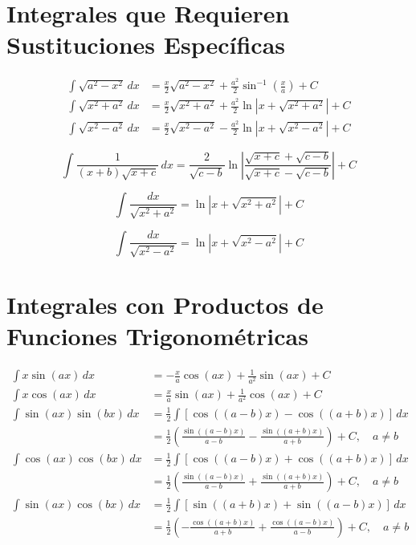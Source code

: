 \documentclass[11pt]{article}
\begin{document}
\section*{Integrales que Requieren Sustituciones Específicas}

\begin{align}
    \int \sqrt{a^2 - x^2} \, dx &= \frac{x}{2} \sqrt{a^2 - x^2} + \frac{a^2}{2} \sin^{-1}\left(\frac{x}{a}\right) + C \\[10pt]
    \int \sqrt{x^2 + a^2} \, dx &= \frac{x}{2} \sqrt{x^2 + a^2} + \frac{a^2}{2} \ln\left| x + \sqrt{x^2 + a^2} \right| + C \\[10pt]
    \int \sqrt{x^2 - a^2} \, dx &= \frac{x}{2} \sqrt{x^2 - a^2} - \frac{a^2}{2} \ln\left| x + \sqrt{x^2 - a^2} \right| + C 
\end{align}

\begin{equation}
\int \frac{1}{(x + b)\sqrt{x + c}} \, dx = 
\frac{2}{\sqrt{c - b}} \ln \left| 
\frac{ \sqrt{x + c} + \sqrt{c - b} }{ \sqrt{x + c} - \sqrt{c - b} } 
\right| + C
\end{equation}


\begin{equation}
    \int \frac{dx}{\sqrt{x^2 + a^2}} = \ln\left| x + \sqrt{x^2 + a^2} \right| + C
\end{equation}

\begin{equation}
    \int \frac{dx}{\sqrt{x^2 - a^2}} = \ln\left| x + \sqrt{x^2 - a^2} \right| + C
\end{equation}

\section*{Integrales con Productos de Funciones Trigonométricas}

\begin{align}
    \int x \sin(ax) \, dx &= -\frac{x}{a} \cos(ax) + \frac{1}{a^2} \sin(ax) + C \\[10pt]
    \int x \cos(ax) \, dx &= \frac{x}{a} \sin(ax) + \frac{1}{a^2} \cos(ax) + C \\[10pt]
    \int \sin(ax) \sin(bx) \, dx &= \frac{1}{2} \int [\cos((a-b)x) - \cos((a+b)x)] \, dx \\[10pt]
    &= \frac{1}{2} \left( \frac{\sin((a-b)x)}{a-b} - \frac{\sin((a+b)x)}{a+b} \right) + C, \quad a \neq b \\[10pt]
    \int \cos(ax) \cos(bx) \, dx &= \frac{1}{2} \int [\cos((a-b)x) + \cos((a+b)x)] \, dx \\[10pt]
    &= \frac{1}{2} \left( \frac{\sin((a-b)x)}{a-b} + \frac{\sin((a+b)x)}{a+b} \right) + C, \quad a \neq b \\[10pt]
    \int \sin(ax) \cos(bx) \, dx &= \frac{1}{2} \int [\sin((a+b)x) + \sin((a-b)x)] \, dx \\[10pt]
    &= \frac{1}{2} \left( -\frac{\cos((a+b)x)}{a+b} + \frac{\cos((a-b)x)}{a-b} \right) + C, \quad a \neq b
\end{align}
\end{document}
